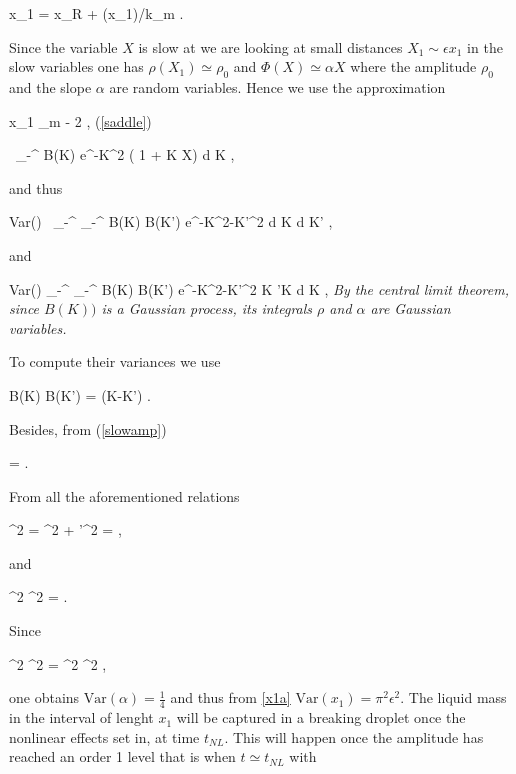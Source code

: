 \be
x_1 = x_R + \Phi(\epsilon x_1)/k_m . 
\nd

Since the variable $X$ is slow at we are looking at small 
distances $X_1 \sim \epsilon x_1$ in the slow variables
one has $\rho(X_1) \simeq \rho_0$ and  $\Phi(X) \simeq \alpha X$ where 
the amplitude $\rho_0$ and the slope $\alpha$ are random
variables. Hence we use the approximation  

\be
x_1 \simeq \lambda_m -  2 \pi \alpha \epsilon  \label{x1a} , 
\nd
(\ref{saddle})

\be
\rho [ 1 + \ii \alpha X] \simeq \int_{-\infty}^{\infty}  B(K) e^{-K^2} ( 1 + \ii K X)  {\textrm{d}} K ,
\nd

and thus

\be
\textrm{Var}(\rho)  \simeq \int_{-\infty}^{\infty} \int_{-\infty}^{\infty}  B(K) B(K') e^{-K^2-K'^2}  {\textrm{d}} K  {\textrm{d}} K'  , 
\nd

and

\be
\textrm{Var}(\rho \alpha) \simeq  \int_{-\infty}^{\infty} \int_{-\infty}^{\infty}  B(K) B(K') e^{-K^2-K'^2}  K 'K {\textrm{d}} K , 
\nd
{\em By the central limit theorem, since $B(K))$ is a Gaussian process, its integrals $\rho$ and $\alpha$ are Gaussian variables.}

To compute their variances we use

\be
\langle B(K) \overline B(K') \rangle =  \delta(K-K') .
\nd

Besides, from (\ref{slowamp}) 

\be
\langle \rho \rangle =  . 
\nd

From all the aforementioned relations  

\be
\langle \rho^2 \rangle = \langle \rho \rangle^2 + \langle \rho'^2 \rangle =   , 
\nd

and

\be
\langle \rho^2 \alpha^2 \rangle =   . 
\nd

Since

\be
\langle \rho^2 \alpha^2 \rangle =  \langle \rho^2 \rangle \langle \alpha^2 \rangle , 
\nd

one obtains $\textrm{Var}( \alpha ) = \frac 14$
and thus from \eqref{x1a}  $\textrm{Var}(x_1) =\pi^2 \epsilon^2$.
The liquid mass in the interval of lenght $x_1$ will be captured in a breaking droplet
once the nonlinear effects set in, at time $t_{NL}$. This will happen once the
amplitude has reached an order 1 level that is when $t \simeq t_{NL}$ with

